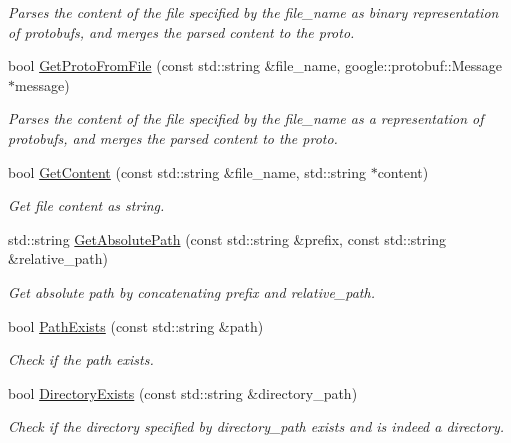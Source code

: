 \begin{DoxyCompactItemize}
\begin{DoxyCompactList}\small\item\em Parses the content of the file specified by the file\-\_\-name as binary representation of protobufs, and merges the parsed content to the proto. \end{DoxyCompactList}\item 
bool \hyperlink{namespaceapollo_1_1cyber_1_1common_a26b275efbad46e735071e540445b19a9}{Get\-Proto\-From\-File} (const std\-::string \&file\-\_\-name, google\-::protobuf\-::\-Message $\ast$message)
\begin{DoxyCompactList}\small\item\em Parses the content of the file specified by the file\-\_\-name as a representation of protobufs, and merges the parsed content to the proto. \end{DoxyCompactList}\item 
bool \hyperlink{namespaceapollo_1_1cyber_1_1common_acd43c697ce645990ee9373683f10b1bd}{Get\-Content} (const std\-::string \&file\-\_\-name, std\-::string $\ast$content)
\begin{DoxyCompactList}\small\item\em Get file content as string. \end{DoxyCompactList}\item 
std\-::string \hyperlink{namespaceapollo_1_1cyber_1_1common_a8948fca1037f8256c7c62ac2dbc378c3}{Get\-Absolute\-Path} (const std\-::string \&prefix, const std\-::string \&relative\-\_\-path)
\begin{DoxyCompactList}\small\item\em Get absolute path by concatenating prefix and relative\-\_\-path. \end{DoxyCompactList}\item 
bool \hyperlink{namespaceapollo_1_1cyber_1_1common_a2461aa999fa88dc32c4ef41a9fae95ae}{Path\-Exists} (const std\-::string \&path)
\begin{DoxyCompactList}\small\item\em Check if the path exists. \end{DoxyCompactList}\item 
bool \hyperlink{namespaceapollo_1_1cyber_1_1common_ac3aa31e012b08343b8d71f7c1d68ee79}{Directory\-Exists} (const std\-::string \&directory\-\_\-path)
\begin{DoxyCompactList}\small\item\em Check if the directory specified by directory\-\_\-path exists and is indeed a directory. \end{DoxyCompactList}\item 

\end{DoxyCompactItemize}

